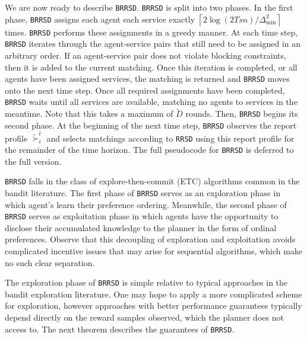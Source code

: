 \documentclass[letterpaper,11pt]{article}
\begin{document}
We are now ready to describe \texttt{BRRSD}. \texttt{BRRSD} is split into two phases. In the first phase, \texttt{BRRSD} assigns each agent each service exactly
$\left\lceil2\log(2Tsn)/ \Delta_{\text{min}}^{2}\right\rceil$ times. \texttt{BRRSD} performs these assignments in a greedy manner. At each time step, \texttt{BRRSD} iterates through the agent-service pairs that still need to be assigned in an arbitrary order. If an agent-service pair does not violate blocking constraints, then it is added to the current matching. Once this iteration is completed, or all agents have been assigned services, the matching is returned and \texttt{BRRSD} moves onto the next time step. Once all required assignments have been completed, \texttt{BRRSD} waits until all services are available, matching no agents to services in the meantime. Note that this takes a maximum of $\tilde{D}$ rounds. Then, \texttt{BRRSD} begins its second phase. At the beginning of the next time step, \texttt{BRRSD} observes the report profile $\tilde{\succ}_{i}^{t}$ and selects matchings according to \texttt{RRSD} using this report profile for the remainder of the time horizon. The full pseudocode for \texttt{BRRSD} is deferred to the full version.

\texttt{BRRSD} falls in the class of explore-then-commit (ETC) algorithms common in the bandit literature. The first phase of \texttt{BRRSD} serves as an exploration phase in which agent's learn their preference ordering. Meanwhile, the second phase of \texttt{BRRSD} serves as exploitation phase in which agents have the opportunity to disclose their accumulated knowledge to the planner in the form of ordinal preferences. Observe that this decoupling of exploration and exploitation avoids complicated incentive issues that may arise for sequential algorithms, which make no such clear separation. 

The exploration phase of \texttt{BRRSD} is simple relative to typical approaches in the bandit exploration literature. One may hope to apply a more complicated scheme for exploration, however approaches with better performance guarantees typically depend directly on the reward samples observed, which the planner does not access to.
%
The next theorem describes the  guarantees of \texttt{BRRSD}.
\end{document}

